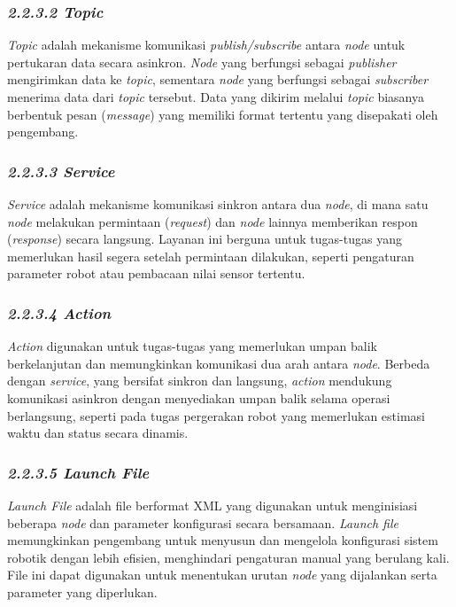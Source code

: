 \subsubsection{\emph{2.2.3.2 Topic}}
\emph{Topic} adalah mekanisme komunikasi \emph{publish/subscribe} antara \emph{node} untuk pertukaran data secara asinkron. \emph{Node} yang berfungsi sebagai \emph{publisher} mengirimkan data ke \emph{topic}, sementara \emph{node} yang berfungsi sebagai \emph{subscriber} menerima data dari \emph{topic} tersebut. Data yang dikirim melalui \emph{topic} biasanya berbentuk pesan (\emph{message}) yang memiliki format tertentu yang disepakati oleh pengembang.

\subsubsection{\emph{2.2.3.3 Service}}
\emph{Service} adalah mekanisme komunikasi sinkron antara dua \emph{node}, di mana satu \emph{node} melakukan permintaan (\emph{request}) dan \emph{node} lainnya memberikan respon (\emph{response}) secara langsung. Layanan ini berguna untuk tugas-tugas yang memerlukan hasil segera setelah permintaan dilakukan, seperti pengaturan parameter robot atau pembacaan nilai sensor tertentu.

\subsubsection{\emph{2.2.3.4 Action}}
\emph{Action} digunakan untuk tugas-tugas yang memerlukan umpan balik berkelanjutan dan memungkinkan komunikasi dua arah antara \emph{node}. Berbeda dengan \emph{service}, yang bersifat sinkron dan langsung, \emph{action} mendukung komunikasi asinkron dengan menyediakan umpan balik selama operasi berlangsung, seperti pada tugas pergerakan robot yang memerlukan estimasi waktu dan status secara dinamis.

\subsubsection{\emph{2.2.3.5 Launch File}}
\emph{Launch File} adalah file berformat XML yang digunakan untuk menginisiasi beberapa \emph{node} dan parameter konfigurasi secara bersamaan. \emph{Launch file} memungkinkan pengembang untuk menyusun dan mengelola konfigurasi sistem robotik dengan lebih efisien, menghindari pengaturan manual yang berulang kali. File ini dapat digunakan untuk menentukan urutan \emph{node} yang dijalankan serta parameter yang diperlukan.

